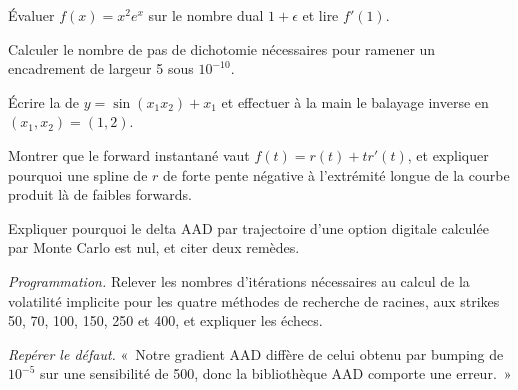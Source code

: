 \begin{exercise}[$\star$]\label{exo:qm:transforms-interpolation-and-algorithmic-differentiation:2}
Évaluer $f(x) = x^2e^x$ sur le nombre dual $1 + \epsilon$ et lire $f'(1)$.
\end{exercise}

\begin{exercise}[$\star$]\label{exo:qm:transforms-interpolation-and-algorithmic-differentiation:3}
Calculer le nombre de pas de dichotomie nécessaires pour ramener un encadrement de largeur 5 sous $10^{-10}$.
\end{exercise}

\begin{exercise}[$\star\star$]\label{exo:qm:transforms-interpolation-and-algorithmic-differentiation:4}
Écrire la  de $y = \sin(x_1x_2) + x_1$ et effectuer à la main le balayage inverse en $(x_1, x_2) = (1, 2)$.
\end{exercise}

\begin{exercise}[$\star\star$]\label{exo:qm:transforms-interpolation-and-algorithmic-differentiation:5}
Montrer que le forward instantané vaut $f(t) = r(t) + tr'(t)$, et expliquer pourquoi une spline de $r$ de forte pente négative à l'extrémité longue de la courbe produit là de faibles forwards.
\end{exercise}

\begin{exercise}[$\star\star$]\label{exo:qm:transforms-interpolation-and-algorithmic-differentiation:6}
Expliquer pourquoi le delta AAD par trajectoire d'une option digitale calculée par Monte Carlo est nul, et citer deux remèdes.
\end{exercise}

\begin{exercise}[$\star\star\star$]\label{exo:qm:transforms-interpolation-and-algorithmic-differentiation:7}
\emph{Programmation.} Relever les nombres d'itérations nécessaires au calcul de la volatilité implicite pour les quatre méthodes de recherche de racines, aux strikes 50, 70, 100, 150, 250 et 400, et expliquer les échecs.
\end{exercise}

\begin{exercise}[$\star\star\star$]\label{exo:qm:transforms-interpolation-and-algorithmic-differentiation:8}
\emph{Repérer le défaut.} «~Notre gradient AAD diffère de celui obtenu par bumping de $10^{-5}$ sur une sensibilité de 500, donc la bibliothèque AAD comporte une erreur.~»
\end{exercise}


